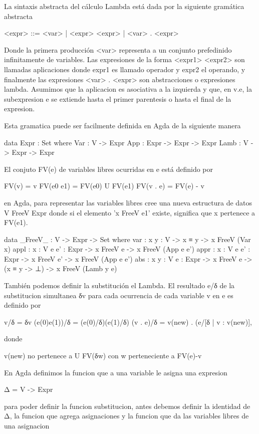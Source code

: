 	La sintaxis abstracta del cálculo Lambda está dada por la siguiente gramática abstracta

<expr> ::= <var> | <expr> <expr> | \lambda <var> . <expr>

Donde la primera producción <var> representa a un conjunto prefedinido infinitamente de variables. Las expresiones de la forma <expr1> <expr2> son llamadas aplicaciones donde expr1 es llamado operador y expr2 el operando, y finalmente las expresiones \lambda <var> . <expr> son abstracciones o expresiones lambda.
	Asumimos que la aplicacion es asociativa a la izquierda y que, en \lambda v.e, la subexpresion e se extiende hasta el primer parentesis o hasta el final de la expresion.

Esta gramatica puede ser facilmente definida en Agda de la siguiente manera

 data Expr : Set where
  Var   : V -> Expr
  App   : Expr -> Expr -> Expr
  Lamb  : V -> Expr -> Expr


	El conjuto FV(e) de variables libres ocurridas en e está definido por

 FV(v) = {v}
 FV(e0 e1) = FV(e0) U FV(e1)
 FV(\lambda v . e) = FV(e) - {v}

en Agda, para representar las variables libres cree una nueva estructura de datos
 V FreeV Expr
donde si el elemento 'x FreeV e1' existe, significa que x pertenece a FV(e1).

 data _FreeV_ : V -> Expr -> Set where
   var : {x y : V} -> x ≡ y ->
          x FreeV (Var x)
   appl : {x : V} {e e' : Expr} -> x FreeV e ->
          x FreeV (App e e')
   appr : {x : V} {e e' : Expr} -> x FreeV e' ->
          x FreeV (App e e')
   abs  : {x y : V} {e : Expr} -> x FreeV e -> (x ≡ y -> ⊥) ->
          x FreeV (Lamb y e)

	También podemos definir la substitución el Lambda. El resultado e/δ de la substitucion simultanea δv para cada ocurrencia de cada variable v en e es definido por

  v/δ = δv
  (e(0)e(1))/δ = (e(0)/δ)(e(1)/δ)
  (\lambda v . e)/δ = \lambda v(new) . (e/[δ | v : v(new)],

donde

  v(new) no pertenece a U FV(δw) con w perteneciente a FV(e)-{v}


En Agda definimos la funcion que a una variable le asigna una expresion

 Δ = V -> Expr

para poder definir la funcion substitucion, antes debemos definir la identidad de Δ, la funcion que agrega asignaciones y la funcion que da las variables libres de una asignacion

